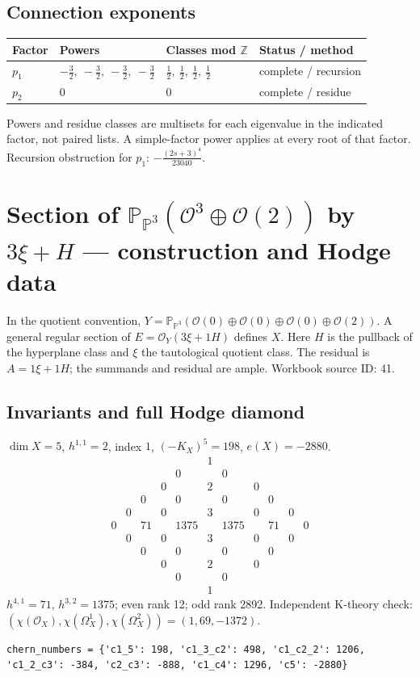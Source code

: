 \documentclass[10pt,a4paper]{article}
\begin{document}
\subsection*{Connection exponents}
\begin{center}\begin{tabular}{llll}\toprule Factor & Powers & Classes mod $\mathbb Z$ & Status / method\\\midrule
$p_{1}$ & $- \frac{3}{2},\ - \frac{3}{2},\ - \frac{3}{2},\ - \frac{3}{2}$ & $\frac{1}{2},\ \frac{1}{2},\ \frac{1}{2},\ \frac{1}{2}$ & complete / recursion\\
$p_{2}$ & $0$ & $0$ & complete / residue\\
\bottomrule\end{tabular}\end{center}
Powers and residue classes are multisets for each eigenvalue in the indicated factor, not paired lists. A simple-factor power applies at every root of that factor.
Recursion obstruction for $p_{1}$: $- \frac{\left(2 s + 3\right)^{4}}{23040}$.
\clearpage\section*{Section of $\mathbb P_{\mathbb P^{3}}(\mathcal O^{3}\oplus \mathcal O(2))$ by $3\xi +H$ --- construction and Hodge data}\label{entry:PB5-041}
In the quotient convention, $Y=\mathbb P_{\mathbb P^{3}}(\mathcal O(0)\oplus\mathcal O(0)\oplus\mathcal O(0)\oplus\mathcal O(2))$.
A general regular section of $E=\mathcal O_Y(3\xi+1H)$ defines $X$.
Here $H$ is the pullback of the hyperplane class and $\xi$ the tautological quotient class. The residual is $A=1\xi+1H$; the summands and residual are ample.
Workbook source ID: 41.
\subsection*{Invariants and full Hodge diamond}
$\dim X=5$, $h^{1,1}=2$, index $1$, $(-K_X)^5=198$, $e(X)=-2880$.
\[\begin{array}{ccccccccccc}&&&&&1&&&&&\\&&&&0&&0&&&&\\&&&0&&2&&0&&&\\&&0&&0&&0&&0&&\\&0&&0&&3&&0&&0&\\0&&71&&1375&&1375&&71&&0\\&0&&0&&3&&0&&0&\\&&0&&0&&0&&0&&\\&&&0&&2&&0&&&\\&&&&0&&0&&&&\\&&&&&1&&&&&\end{array}\]
$h^{4,1}=71$, $h^{3,2}=1375$; even rank 12; odd rank 2892.
Independent K-theory check: $(\chi(\mathcal O_X),\chi(\Omega_X^1),\chi(\Omega_X^2))=(1, 69, -1372)$.
\begin{lstlisting}
chern_numbers = {'c1_5': 198, 'c1_3_c2': 498, 'c1_c2_2': 1206, 'c1_2_c3': -384, 'c2_c3': -888, 'c1_c4': 1296, 'c5': -2880}
\end{lstlisting}
\end{document}
